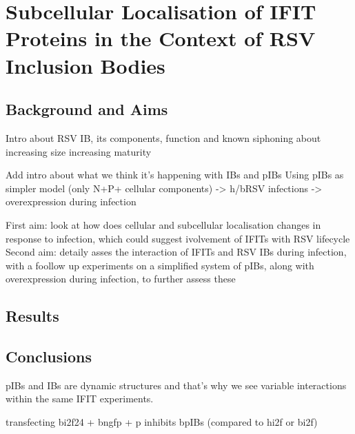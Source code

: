 \chapter{Subcellular Localisation of IFIT Proteins in the Context of RSV Inclusion Bodies} \label{ch:Subcellular Localisation of IFIT Proteins in the Context of RSV Inclusion Bodies}
\section{Background and Aims} \label{sec:Background and Aims-Chapter3}
Intro about RSV IB, its components, function and known siphoning about increasing size increasing maturity


Add intro about what we think it's happening with IBs and pIBs
Using pIBs as simpler model (only N+P+ cellular components) -> h/bRSV infections -> overexpression during infection

First aim: look at how does cellular and subcellular localisation changes in response to infection, which could suggest ivolvement of IFITs with RSV lifecycle
Second aim: detaily asses the interaction of IFITs and RSV IBs during infection, with a foollow up experiments on a simplified system of pIBs, along with overexpression during infection, to further assess these



\section{Results} \label{sec:Results-Chapter3}





\section{Conclusions} \label{sec:Conclusions-Chapter3}
pIBs and IBs are dynamic structures and that's why we see variable interactions within the same IFIT experiments.

transfecting bi2f24 + bngfp + p inhibits bpIBs (compared to hi2f or bi2f)


